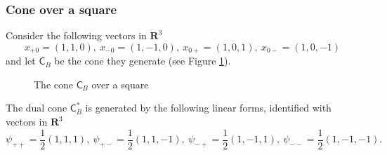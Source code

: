 \documentclass{amsart}
\newcommand{\gC}{\mathsf{C}}
\newcommand{\R}{\mathbf{R}}
\theoremstyle{plain}
\begin{document}
\subsubsection*{Cone over a square}

Consider the following vectors in $\R^3$
\begin{equation} \label{eq:square} x_{+0} = (1,1,0),\  x_{-0} = (1,-1,0),\  x_{0+} = (1,0,1),\ x_{0-} = (1,0,-1)\end{equation}
and let $\gC_B$ be the cone they generate (see Figure \ref{ee}). 

\begin{figure}[htbp] \begin{center}
\end{center}
\caption{The cone $\gC_B$ over a square}
\label{ee}
\end{figure}

The dual cone $\gC^*_B$ is generated by the following linear forms, identified with vectors in $\R^3$
\[ \psi_{++} = \frac{1}{2}(1,1,1),\  \psi_{+-} = \frac{1}{2}(1,1,-1),\  \psi_{-+} = \frac{1}{2}(1,-1,1),\ \psi_{--} = \frac{1}{2}(1,-1,-1).\]
\end{document}
